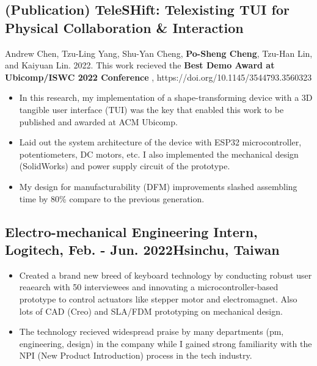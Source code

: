 \documentclass[12pt]{article}
\begin{document}
    \subsection*{(Publication) TeleSHift: Telexisting TUI for Physical Collaboration \& Interaction}
    { \small
    {\scriptsize Andrew Chen, Tzu-Ling Yang, Shu-Yan Cheng, \textbf{Po-Sheng Cheng}, Tzu-Han Lin, and Kaiyuan Lin. 2022. This work recieved the \textbf{Best Demo Award at Ubicomp/ISWC 2022 Conference}%
    , https://doi.org/10.1145/3544793.3560323}
        \begin{itemize}
            \item In this research, my implementation of a shape-transforming device with a 3D tangible user interface (TUI) was the key that enabled this work to be published and awarded at ACM Ubicomp.
            \item Laid out the system architecture of the device with ESP32 microcontroller, potentiometers, DC motors, etc. I also implemented the mechanical design (SolidWorks) and power supply circuit of the prototype.
            \item My design for manufacturability (DFM) improvements slashed assembling time by 80\% compare to the previous generation.
        \end{itemize}
        }
    
        \subsection*{Electro-mechanical Engineering Intern, Logitech, Feb. - Jun. 2022\hfill Hsinchu, Taiwan}
        { \small
        \begin{itemize}
            \item Created a brand new breed of keyboard technology by conducting robust user reaearch with 50 interviewees and innovating a microcontroller-based prototype to control actuators like stepper motor and electromagnet. Also lots of CAD (Creo) and SLA/FDM prototyping on mechanical design. 
            \item The technology recieved widespread praise by many departments (pm, engineering, design) in the company while I gained strong familiarity with the NPI (New Product Introduction) process in the tech industry. 
        \end{itemize}
        }
\end{document}
